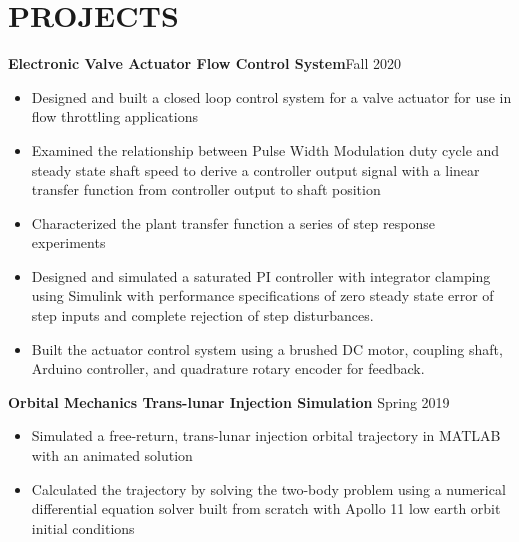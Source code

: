 \documentclass{article}
\begin{document}
\section{PROJECTS}
\textbf{Electronic Valve Actuator Flow Control System}\hfill Fall 2020
\vspace{0.5em}
\begin{itemize}
	\item Designed and built a closed loop control system for a valve actuator for use in flow throttling applications
	\item Examined the relationship between Pulse Width Modulation duty cycle and steady state shaft speed to derive a controller output signal with a linear transfer function from controller output to shaft position  
	\item Characterized the plant transfer function a series of step response experiments
	\item  Designed and simulated a saturated PI controller with integrator clamping using Simulink with performance specifications of zero steady state error of step inputs and complete rejection of step disturbances.
	\item  Built the actuator control system using a brushed DC motor, coupling shaft, Arduino controller, and quadrature rotary encoder for feedback.
\end{itemize}
\vspace{0.5em}
\textbf{Orbital Mechanics Trans-lunar Injection Simulation} 
\hfill
Spring 2019
\vspace{0.5em}
\begin{itemize}
	\item Simulated a free-return, trans-lunar injection orbital trajectory in MATLAB with an animated solution
	\item Calculated the trajectory by solving the two-body problem using a numerical differential equation solver built from scratch with Apollo 11 low earth orbit initial conditions
\end{itemize}

\thispagestyle{empty}
\end{document}
